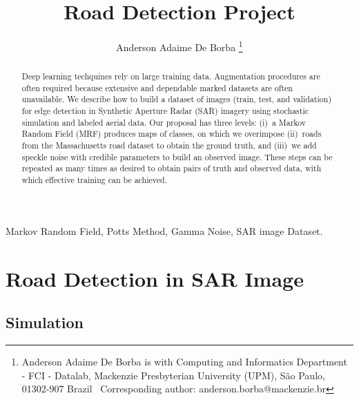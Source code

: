 \documentclass[
  journal,
]{IEEEtran}%
\title{Road Detection Project}
\author{
Anderson Adaime De
Borba\orcidlink{https://orcid.org/0000-0001-8479-9128}%
\thanks{Anderson Adaime De Borba is with Computing and Informatics
Department - FCI - Datalab, Mackenzie Presbyterian University (UPM), São
Paulo, 01302-907 Brazil%
  Corresponding author: anderson.borba@mackenzie.br
}

}
\begin{document}


\maketitle

\begin{abstract}
Deep learning techquines rely on large training data. Augmentation
procedures are often required because extensive and dependable marked
datasets are often unavailable. We describe how to build a dataset of
images (train, test, and validation) for edge detection in Synthetic
Aperture Radar (SAR) imagery using stochastic simulation and labeled
aerial data. Our proposal has three levels: (i)~a Markov Random Field
(MRF) produces maps of classes, on which we overimpose (ii)~roads from
the Massachusetts road dataset to obtain the ground truth, and (iii)~we
add speckle noise with credible parameters to build an observed image.
These steps can be repeated as many times as desired to obtain pairs of
truth and observed data, with which effective training can be achieved.
\end{abstract}
\begin{IEEEkeywords}
Markov Random Field, Potts Method, Gamma Noise, SAR image Dataset.
\end{IEEEkeywords}

%


\section{Road Detection in SAR Image}\label{road-detection-in-sar-image}

\subsection{Simulation}\label{simulation}
\end{document}
